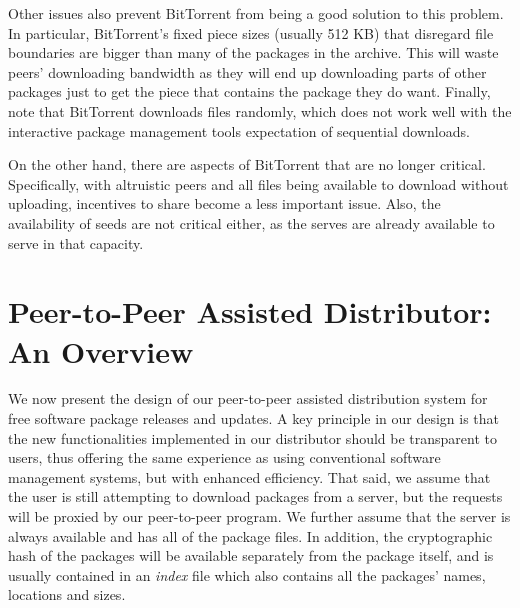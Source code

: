 \documentclass[conference]{IEEEtran}
\begin{document}
Other issues also prevent BitTorrent from being a good solution to
this problem. In particular, BitTorrent's fixed piece sizes (usually 512 KB) that disregard file
boundaries are bigger than many of the packages in the archive. This
will waste peers' downloading bandwidth as they will end up
downloading parts of other packages just to get the piece that
contains the package they do want.
Finally, note that BitTorrent downloads files
randomly, which does not work well with the interactive package
management tools expectation of sequential downloads.

On the other hand, there are aspects of BitTorrent that are no
longer critical. Specifically, with altruistic peers
and all files being available to download without uploading, incentives to share
become a less important issue. Also, the availability of seeds are
not critical either, as the serves are already available to serve in
that capacity.


\section{Peer-to-Peer Assisted Distributor: An Overview}
\label{opportunity}

We now present the design of our peer-to-peer assisted distribution system for free software package releases and
updates. A key principle in our design is that the new functionalities implemented in our distributor should be transparent to users,
thus offering the same experience as using conventional software management systems, but with enhanced efficiency.
That said, we assume that the user is still attempting to download packages from a
server, but the requests will be proxied by our peer-to-peer program.
We further assume that the server is always available and has all of the package files.
In addition, the cryptographic hash of the packages will be available
separately from the package itself, and is usually contained in an
\emph{index} file which also contains all the packages' names,
locations and sizes.
\end{document}

